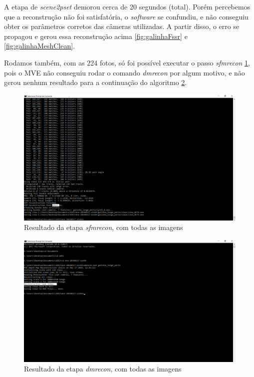 A etapa de {\it scene2pset} demorou cerca de 20 segundos (total). Porém percebemos que a reconstrução não foi satisfatória, o {\it software} se confundiu, e não conseguiu obter os parâmetros corretos das câmeras utilizadas. A partir disso, o erro se propagou e gerou essa reconstrução acima \ref{fig:galinhaFssr} e \ref{fig:galinhaMeshClean}.

Rodamos também, com as 224 fotos, só foi possível executar o passo {\it sfmrecon} \ref{fig:galinhaSfM224}, pois o MVE não conseguiu rodar o comando {\it dmrecon} por algum motivo, e não gerou nenhum resultado para a continuação do algoritmo \ref{fig:galinhaDMR224}.

\begin{figure}[!h]
	\centering
	\includegraphics[width=0.5\linewidth]{figs/mvesfmrecongalinhapertolonge.png}
	\caption{%
	Resultado da etapa {\it sfmrecon}, com todas as imagens
	}\label{fig:galinhaSfM224}
\end{figure}

\begin{figure}[!h]
	\centering
	\includegraphics[width=0.5\linewidth]{figs/mvedmrecongalinhapertolonge.png}
	\caption{%
	Resultado da etapa {\it dmrecon}, com todas as imagens
	}\label{fig:galinhaDMR224}
\end{figure}

